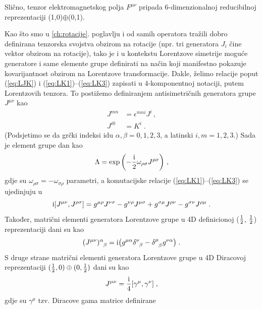Slično, tenzor elektromagnetskog polja $F^{\mu\nu}$ pripada
6-dimenzionalnoj reducibilnoj reprezentaciji (1,0)$\oplus$(0,1).


Kao što smo u \ref{ch:rotacije}. poglavlju i od samih operatora tražili
dobro definirana tenzorska svojstva obzirom na rotacije
(npr. tri generatora $J_i$ čine vektor obzirom na rotacije), tako
je i u kontekstu Lorentzove simetrije moguće generatore i
same elemente grupe definirati na način koji manifestno pokazuje
kovarijantnost obzirom na Lorentzove transformacije.
Dakle, želimo relacije poput (\ref{eq:LJK}) i (\ref{eq:LK1})--(\ref{eq:LK3}) 
zapisati u 4-komponentnoj notaciji, putem Lorentzovih tenzora.
To postižemo definiranjem antisimetričnih generatora 
grupe  $J^{\mu\nu}$ kao
\begin{align}
J^{mn}& = \epsilon^{mni} J^i \,, \label{eq:defJmn}\\
J^{i0}& = K^i \;.
\label{eq:defJi0}
\end{align}
(Podsjetimo se da grčki indeksi idu $\alpha,\beta = 0,1,2,3$, a 
latinski $i,m = 1,2,3$.)  
Sada je element grupe  dan kao 
\begin{equation}
 \Lambda = \exp\left(-\frac{\textrm{i}}{2} \omega_{\rho\sigma} J^{\rho\sigma}\right) \,,
\label{eq:4DLorentz}
\end{equation}
gdje su $\omega_{\rho\sigma} = - \omega_{\sigma\rho}$ parametri,
a komutacijske relacije (\ref{eq:LK1})--(\ref{eq:LK3}) se ujedinjuju u
\begin{equation}
\textrm{i} [ J^{\mu\nu}, J^{\rho\sigma}] = g^{\mu\rho} J^{\nu\sigma}
- g^{\nu\rho} J^{\mu\sigma} + g^{\sigma\mu} J^{\rho\nu}
- g^{\sigma\nu} J^{\rho\mu} \;.
\label{eq:4DLorKom}
\end{equation}
Također, matrični elementi generatora Lorentzove grupe u
4D definicionoj ($\frac{1}{2}$, $\frac{1}{2}$) reprezentaciji dani su kao
\begin{equation}
\tensor{(J^{\mu\nu})}{^\alpha_\beta} = \rmi \big(
g^{\mu\alpha}\tensor{\delta}{^\nu_\beta} - \tensor{\delta}{^\mu_\beta}
g^{\nu\alpha} \big) \;.
\label{eq:4DJmn}
\end{equation}
S druge strane matrični elementi generatora Lorentzove grupe u
4D Diracovoj reprezentaciji
$(\frac{1}{2}, 0) \oplus (0, \frac{1}{2})$
dani su kao
\begin{equation}
 J^{\mu\nu} = \frac{\textrm{i}}{4} [\gamma^\mu, \gamma^\nu] \;,
\label{eq:DiracJ}
\end{equation}
gdje su $\gamma^\mu$ tzv. Diracove gama matrice definirane

